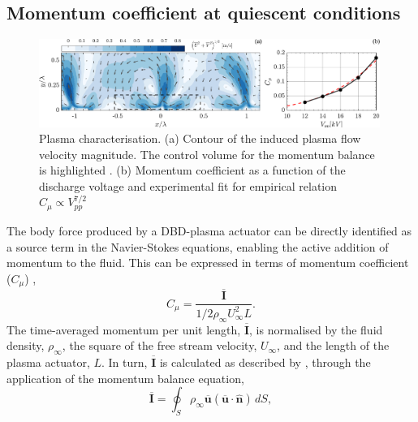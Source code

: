 \subsection{Momentum coefficient at quiescent conditions} \label{ss:plasma_char}
%
\begin{figure}
    \centering
    \includegraphics[width = 0.99\textwidth]{figures/methodology/plasmachar_rebut.pdf}
    \caption{Plasma characterisation. (a) Contour of the induced plasma flow velocity magnitude. The control volume for the momentum balance is highlighted . (b) Momentum coefficient as a function of the discharge voltage  and experimental fit for empirical relation $C_\mu \propto V_{pp}^{7/2}$ } %
    \label{fig:plasma_char}
\end{figure}
%
The body force produced by a DBD-plasma actuator can be directly identified as a source term in the Navier-Stokes equations, enabling the active addition of momentum to the fluid. This can be expressed in terms of momentum coefficient ($C_\mu$) \citep{Amitay2001Cmu},
\begin{equation} \label{eq:Cmu}
    C_\mu = \frac{\mathbf{\overline{I}}}{1/2\rho_\infty U_\infty^2 L}.
\end{equation}
The time-averaged momentum per unit length, $\mathbf{\overline{I}}$, is normalised by the fluid density, $\rho_\infty$, the square of the free stream velocity, $U_\infty$, and the length of the plasma actuator, $L$. In turn, $\mathbf{\overline{I}}$ is calculated as described by \citet{kotsonis2015control}, through the application of the momentum balance equation,
\begin{equation}
    \mathbf{\overline{I}} = \oint_S \rho_\infty \mathbf{\overline{u}} \left( \mathbf{\overline{u}} \cdot \mathbf{\hat{n}}  \right) \,dS,
\end{equation}
